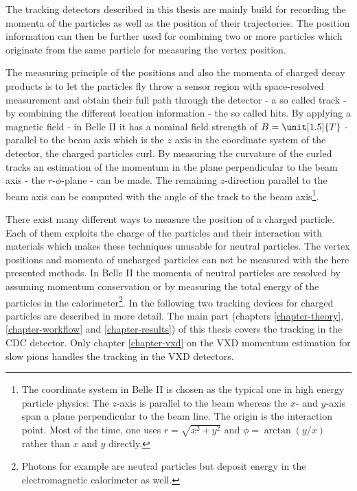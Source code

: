 The tracking detectors described in this thesis are mainly build for recording the momenta of the particles as well as the position of their trajectories. The position information can then be further used for combining two or more particles which originate from the same particle for measuring the vertex position. %

The measuring principle of the positions and also the momenta of charged decay products is to let the particles fly throw a sensor region with space-resolved measurement and obtain their full path through the detector - a so called track - by combining the different location information - the so called hits. By applying a magnetic field - in Belle II it has a nominal field strength of $B = \unit[1.5]{T}$ - parallel to the beam axis which is the $z$ axis in the coordinate system of the detector, the charged particles curl. By measuring the curvature of the curled tracks an estimation of the momentum in the plane perpendicular to the beam axis - the $r$-$\phi$-plane - can be made. The remaining $z$-direction parallel to the beam axis can be computed with the angle of the track to the beam axis\footnote{The coordinate system in Belle II is chosen as the typical one in high energy particle physics: The $z$-axis is parallel to the beam whereas the $x$- and $y$-axis span a plane perpendicular to the beam line. The origin is the interaction point. Most of the time, one uses $r = \sqrt{x^2 + y^2}$ and $\phi = \arctan(y/x)$ rather than $x$ and $y$ directly.}.

There exist many different ways to measure the position of a charged particle. Each of them exploits the charge of the particles and their interaction with materials which makes these techniques unusable for neutral particles. The vertex positions and momenta of uncharged particles can not be measured with the here presented methods. In Belle II the momenta of neutral particles are resolved by assuming momentum conservation or by measuring the total energy of the particles in the calorimeter\footnote{Photons for example are neutral particles but deposit energy in the electromagnetic calorimeter as well.}. In the following two tracking devices for charged particles are described in more detail. The main part (chapters \ref{chapter-theory}, \ref{chapter-workflow} and \ref{chapter-results}) of this thesis covers the tracking in the CDC detector. Only chapter \ref{chapter-vxd} on the VXD momentum estimation for slow pions handles the tracking in the VXD detectors.

